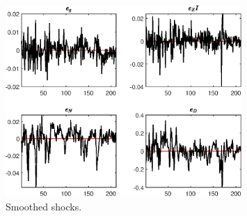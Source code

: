  
\begin{figure}[H]
\centering 
\includegraphics[width=0.80\textwidth]{BRS_growth_ext_fd/graphs/BRS_growth_ext_fd_SmoothedShocks1}
\caption{Smoothed shocks.}\label{Fig:SmoothedShocks:1}
\end{figure}


